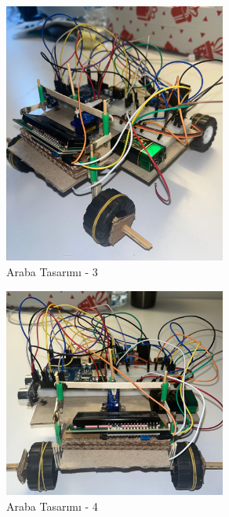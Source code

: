 \begin{figure}[H]
\centering
\includegraphics[width=0.65\textwidth]{Resimler/34.png}
\caption{Araba Tasarımı - 3 }
\label{fig:34}
\end{figure}

\begin{figure}[H]
\centering
\includegraphics[width=0.65\textwidth]{Resimler/35.png}
\caption{Araba Tasarımı - 4 }
\label{fig:35}
\end{figure}
